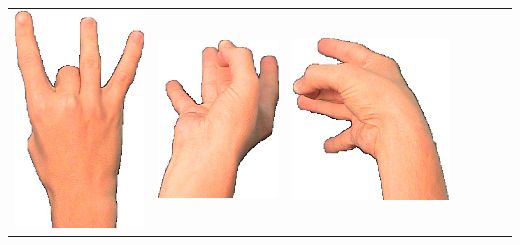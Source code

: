 \documentclass{article}
\begin{document}
\begin{center}
\begin{tabular}{r*{6}{c}}
\includegraphics[scale=0.1]{images/08-01-3.jpg}&
\includegraphics[scale=0.1]{images/08-01-4.jpg}&
\includegraphics[scale=0.1]{images/08-01-5.jpg}&

\end{tabular}
\end{center}
\end{document}
